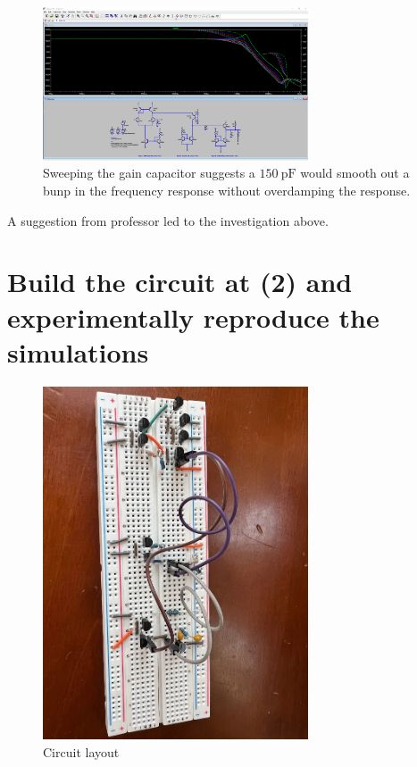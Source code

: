 \documentclass{article}
\begin{document}
	\begin{figure}[H]
	    \centering
	    \includegraphics[width=0.7\textwidth]{cap-sweep}
	    \caption{Sweeping the gain capacitor suggests a $\SI{150}{\pF}$ would smooth out a bunp in the frequency response without overdamping the response.}
	\end{figure}
	
	A suggestion from professor led to the investigation above.
	
	\section{Build the circuit at (2) and experimentally reproduce the simulations}
	
	\begin{figure}[H]
	    \centering
	    \includegraphics[width=0.7\textwidth]{breadboard}
	    \caption{Circuit layout}
	\end{figure}
	
\end{document}
